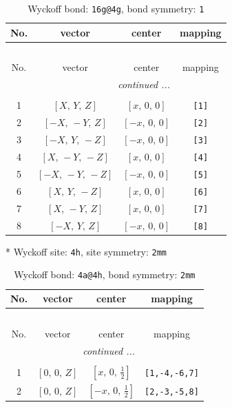 \documentclass[fleqn,8pt]{jsarticle}
\begin{document}
\renewcommand{\arraystretch}{1.2}
\begin{longtable}{cccc}
\caption{Wyckoff bond: {\tt 16g@4g}, bond symmetry: {\tt 1}}
 \\
 \hline \hline
No. & vector & center & mapping \\ \hline \endfirsthead

\multicolumn{3}{l}{\tablename\ \thetable{}} \\
 \hline \hline
No. & vector & center & mapping \\ \hline \endhead

 \hline \hline
\multicolumn{3}{r}{\footnotesize\it continued ...} \\ \endfoot

 \hline \hline
\multicolumn{3}{r}{} \\ \endlastfoot

1 & $\left[ X,\, Y,\, Z \right]$ & $\left[ x,\, 0,\, 0 \right]$ & {\tt [1]} \\ \hline
2 & $\left[ - X,\, - Y,\, Z \right]$ & $\left[ - x,\, 0,\, 0 \right]$ & {\tt [2]} \\ \hline
3 & $\left[ - X,\, Y,\, - Z \right]$ & $\left[ - x,\, 0,\, 0 \right]$ & {\tt [3]} \\ \hline
4 & $\left[ X,\, - Y,\, - Z \right]$ & $\left[ x,\, 0,\, 0 \right]$ & {\tt [4]} \\ \hline
5 & $\left[ - X,\, - Y,\, - Z \right]$ & $\left[ - x,\, 0,\, 0 \right]$ & {\tt [5]} \\ \hline
6 & $\left[ X,\, Y,\, - Z \right]$ & $\left[ x,\, 0,\, 0 \right]$ & {\tt [6]} \\ \hline
7 & $\left[ X,\, - Y,\, Z \right]$ & $\left[ x,\, 0,\, 0 \right]$ & {\tt [7]} \\ \hline
8 & $\left[ - X,\, Y,\, Z \right]$ & $\left[ - x,\, 0,\, 0 \right]$ & {\tt [8]} \\
\end{longtable}
* Wyckoff site: {\tt 4h}, site symmetry: {\tt 2mm}
\renewcommand{\arraystretch}{1.2}
\begin{longtable}{cccc}
\caption{Wyckoff bond: {\tt 4a@4h}, bond symmetry: {\tt 2mm}}
 \\
 \hline \hline
No. & vector & center & mapping \\ \hline \endfirsthead

\multicolumn{3}{l}{\tablename\ \thetable{}} \\
 \hline \hline
No. & vector & center & mapping \\ \hline \endhead

 \hline \hline
\multicolumn{3}{r}{\footnotesize\it continued ...} \\ \endfoot

 \hline \hline
\multicolumn{3}{r}{} \\ \endlastfoot

1 & $\left[ 0,\, 0,\, Z \right]$ & $\left[ x,\, 0,\, \frac{1}{2} \right]$ & {\tt [1,-4,-6,7]} \\ \hline
2 & $\left[ 0,\, 0,\, Z \right]$ & $\left[ - x,\, 0,\, \frac{1}{2} \right]$ & {\tt [2,-3,-5,8]} \\
\end{longtable}
\end{document}
